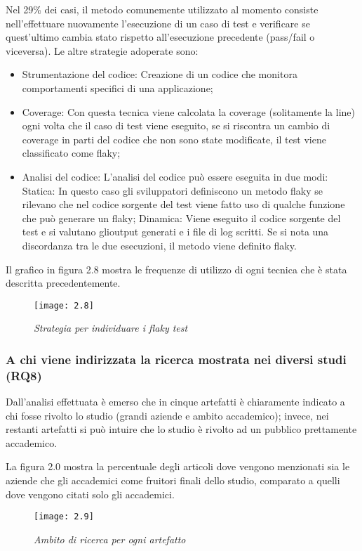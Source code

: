 Nel 29\% dei casi, il metodo comunemente utilizzato al momento consiste
nell’effettuare nuovamente l’esecuzione di un caso di test e verificare se quest’ultimo cambia stato rispetto all’esecuzione precedente (pass/fail o viceversa). Le altre strategie adoperate sono:
\begin{itemize}
	\item Strumentazione del codice: Creazione di un codice che monitora comportamenti specifici di una applicazione;
	\item Coverage: Con questa tecnica viene calcolata la coverage (solitamente la line) ogni volta che il caso di test viene eseguito, se si riscontra un cambio di coverage in parti del codice che non sono state modificate, il test viene classificato come flaky;
	\item Analisi del codice: L’analisi del codice può essere eseguita in due modi:
	\subitem Statica: In questo caso gli sviluppatori definiscono un metodo flaky se rilevano che nel codice sorgente del test viene fatto uso di qualche funzione che può generare un flaky;
	\subitem Dinamica: Viene eseguito il codice sorgente del test e si valutano glioutput generati e i file di log scritti. Se si nota una discordanza tra le due esecuzioni, il metodo viene definito flaky.
\end{itemize}

Il grafico in figura 2.8 mostra le frequenze di utilizzo di ogni tecnica che è stata descritta precedentemente.
\newpage
\begin{figure}[h]
	\centering
	\texttt{[image: 2.8]}
	\caption{\emph{Strategia per individuare i flaky test}}
	\label{fig:mesh1}
\end{figure}
\subsubsection{A chi viene indirizzata la ricerca mostrata nei diversi studi (RQ8)}
Dall'analisi effettuata è emerso che in cinque artefatti è chiaramente indicato a chi fosse rivolto lo studio (grandi aziende e ambito accademico); invece, nei restanti artefatti si può intuire che lo studio è rivolto ad un pubblico prettamente accademico.

La figura 2.0 mostra la percentuale degli articoli dove vengono menzionati sia le aziende che gli accademici come fruitori finali dello studio, comparato a quelli dove vengono citati solo gli accademici.\newpage
\begin{figure}[h]
	\centering
	\texttt{[image: 2.9]}
	\caption{\emph{Ambito di ricerca per ogni artefatto}}
	\label{fig:mesh1}
\end{figure}

